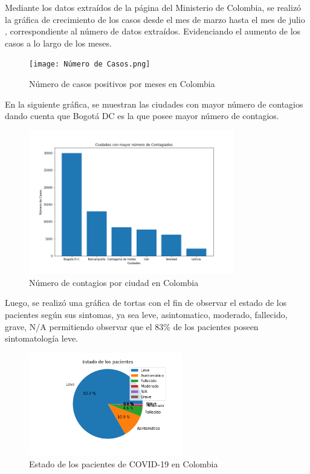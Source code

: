 \documentclass[conference,compsoc,onecolumn]{IEEEtran}
\begin{document}
Mediante los datos extraídos de la página del Ministerio de Colombia, se realizó la gráfica de crecimiento de los casos desde el mes de marzo hasta el mes de julio , correspondiente al número de datos extraídos. Evidenciando el aumento de los casos a lo largo de los meses.
\begin{figure}[H]
    \centering
    \texttt{[image: Número de Casos.png]}
    \caption{Número de casos positivos por meses en Colombia}
    \label{fig:NumeroCasos}
\end{figure}

En la siguiente gráfica, se muestran las ciudades con mayor número de contagios dando cuenta que Bogotá DC es la que posee mayor número de contagios.
\begin{figure}[H]
    \centering
    \includegraphics[keepaspectratio,width=0.8\textwidth]{Ciudades.png}
    \caption{Número de contagios por ciudad en Colombia}
    \label{fig:CasosCiudad}
\end{figure}

Luego, se realizó una gráfica de tortas con el fin de observar el estado de los pacientes según sus sintomas, ya sea leve, asintomatico, moderado, fallecido, grave, N/A permitiendo observar que el 83\% de los pacientes poseen sintomatología leve.
\begin{figure}[H]
    \centering
    \includegraphics[keepaspectratio,width=0.6\textwidth]{EstadoPacientes.png}
    \caption{Estado de los pacientes de COVID-19 en Colombia}
    \label{fig:EstadoPacientes}
\end{figure}
\end{document}

